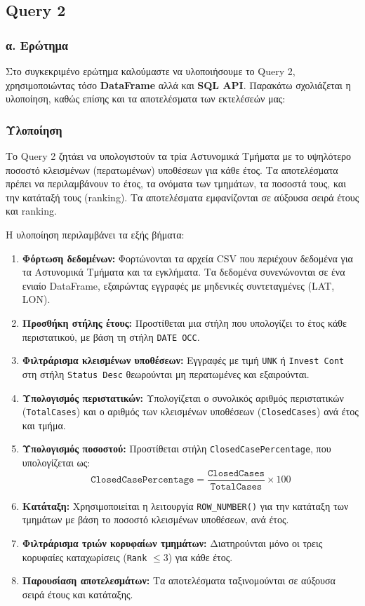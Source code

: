 \documentclass{article}
\begin{document}
\newpage
\subsection{Query 2}
\subsubsection*{\large  α. Ερώτημα}
Στο συγκεκριμένο ερώτημα καλούμαστε να υλοποιήσουμε το Query 2, χρησιμοποιώντας τόσο \textbf{DataFrame} αλλά και \textbf{SQL API}. Παρακάτω σχολιάζεται η υλοποίηση, καθώς επίσης και τα αποτελέσματα των εκτελέσεών μας: 

\subsubsection*{Υλοποίηση}

Το Query 2 ζητάει να υπολογιστούν τα τρία Αστυνομικά Τμήματα με το υψηλότερο ποσοστό κλεισμένων (περατωμένων) υποθέσεων για κάθε έτος. Τα αποτελέσματα πρέπει να περιλαμβάνουν το έτος, τα ονόματα των τμημάτων, τα ποσοστά τους, και την κατάταξή τους (ranking). Τα αποτελέσματα εμφανίζονται σε αύξουσα σειρά έτους και ranking.

Η υλοποίηση περιλαμβάνει τα εξής βήματα:
\begin{enumerate}
    \item \textbf{Φόρτωση δεδομένων:} Φορτώνονται τα αρχεία CSV που περιέχουν δεδομένα για τα Αστυνομικά Τμήματα και τα εγκλήματα. Τα δεδομένα συνενώνονται σε ένα ενιαίο DataFrame, εξαιρώντας εγγραφές με μηδενικές συντεταγμένες (LAT, LON).
    \item \textbf{Προσθήκη στήλης έτους:} Προστίθεται μια στήλη που υπολογίζει το έτος κάθε περιστατικού, με βάση τη στήλη \texttt{DATE OCC}.
    \item \textbf{Φιλτράρισμα κλεισμένων υποθέσεων:} Εγγραφές με τιμή \texttt{UNK} ή \texttt{Invest Cont} στη στήλη \texttt{Status Desc} θεωρούνται μη περατωμένες και εξαιρούνται.
    \item \textbf{Υπολογισμός περιστατικών:} Υπολογίζεται ο συνολικός αριθμός περιστατικών (\texttt{TotalCases}) και ο αριθμός των κλεισμένων υποθέσεων (\texttt{ClosedCases}) ανά έτος και τμήμα.
    \item \textbf{Υπολογισμός ποσοστού:} Προστίθεται στήλη \texttt{ClosedCasePercentage}, που υπολογίζεται ως:
          \[
          \texttt{ClosedCasePercentage} = \frac{\texttt{ClosedCases}}{\texttt{TotalCases}} \times 100
          \]
    \item \textbf{Κατάταξη:} Χρησιμοποιείται η λειτουργία \texttt{ROW\_NUMBER()} για την κατάταξη των τμημάτων με βάση το ποσοστό κλεισμένων υποθέσεων, ανά έτος.
    \item \textbf{Φιλτράρισμα τριών κορυφαίων τμημάτων:} Διατηρούνται μόνο οι τρεις κορυφαίες καταχωρίσεις (\texttt{Rank} $\leq 3$) για κάθε έτος.
    \item \textbf{Παρουσίαση αποτελεσμάτων:} Τα αποτελέσματα ταξινομούνται σε αύξουσα σειρά έτους και κατάταξης.
\end{enumerate}
\end{document}
